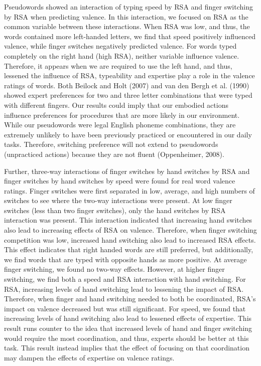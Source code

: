 \documentclass[english,man, mask]{apa6}
\theoremstyle{definition}
\theoremstyle{definition}
\theoremstyle{definition}
\theoremstyle{remark}
\begin{document}
Pseudowords showed an interaction of typing speed by RSA and finger
switching by RSA when predicting valence. In this interaction, we
focused on RSA as the common variable between these interactions. When
RSA was low, and thus, the words contained more left-handed letters, we
find that speed positively influenced valence, while finger switches
negatively predicted valence. For words typed completely on the right
hand (high RSA), neither variable influence valence. Therefore, it
appears when we are required to use the left hand, and thus, lessened
the influence of RSA, typeability and expertise play a role in the
valence ratings of words. Both Beilock and Holt (2007) and van den Bergh
et al. (1990) showed expert preferences for two and three letter
combinations that were typed with different fingers. Our results could
imply that our embodied actions influence preferences for procedures
that are more likely in our environment. While our pseudowords were
legal English phoneme combinations, they are extremely unlikely to have
been previously practiced or encountered in our daily tasks. Therefore,
switching preference will not extend to pseudowords (unpracticed
actions) because they are not fluent (Oppenheimer, 2008).

Further, three-way interactions of finger switches by hand switches by
RSA and finger switches by hand switches by speed were found for real
word valence ratings. Finger switches were first separated in low,
average, and high numbers of switches to see where the two-way
interactions were present. At low finger switches (less than two finger
switches), only the hand switches by RSA interaction was present. This
interaction indicated that increasing hand switches also lead to
increasing effects of RSA on valence. Therefore, when finger switching
competition was low, increased hand switching also lead to increased RSA
effects. This effect indicates that right handed words are still
preferred, but additionally, we find words that are typed with opposite
hands as more positive. At average finger switching, we found no two-way
effects. However, at higher finger switching, we find both a speed and
RSA interaction with hand switching. For RSA, increasing levels of hand
switching lead to lessening the impact of RSA. Therefore, when finger
and hand switching needed to both be coordinated, RSA's impact on
valence decreased but was still significant. For speed, we found that
increasing levels of hand switching also lead to lessened effects of
expertise. This result runs counter to the idea that increased levels of
hand and finger switching would require the most coordination, and thus,
experts should be better at this task. This result instead implies that
the effect of focusing on that coordination may dampen the effects of
expertise on valence ratings.
\end{document}
